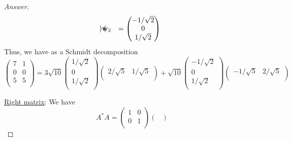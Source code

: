 \documentclass[../psets.tex]{subfiles}
\begin{document}
\begin{enumerate}[label={\textbf{3.\arabic*.}}]
\begin{proof}[Answer]
\begin{align*}
\begin{pmatrix}
            \end{pmatrix}&
            \mathbf{w}_2 &=
            \begin{pmatrix}
                -1/\sqrt{2}\\
                0\\
                1/\sqrt{2}\\
            \end{pmatrix}
        \end{align*}
        Thus, we have as a Schmidt decomposition
        \begin{equation*}
            \begin{pmatrix}
                7 & 1\\
                0 & 0\\
                5 & 5\\
            \end{pmatrix}
            = 3\sqrt{10}
            \begin{pmatrix}
                1/\sqrt{2}\\
                0\\
                1/\sqrt{2}\\
            \end{pmatrix}
            \begin{pmatrix}
                2/\sqrt{5} & 1/\sqrt{5}\\
            \end{pmatrix}
            +\sqrt{10}
            \begin{pmatrix}
                -1/\sqrt{2}\\
                0\\
                1/\sqrt{2}\\
            \end{pmatrix}
            \begin{pmatrix}
                -1/\sqrt{5} & 2/\sqrt{5}\\
            \end{pmatrix}
        \end{equation*}\par
        \underline{Right matrix}: We have
        \begin{equation*}
            A^*A =
            \begin{pmatrix}
                1 & 0\\
                0 & 1\\
            \end{pmatrix}
            \begin{pmatrix}

\end{pmatrix}
\end{equation*}
\end{proof}
\end{enumerate}
\end{document}
